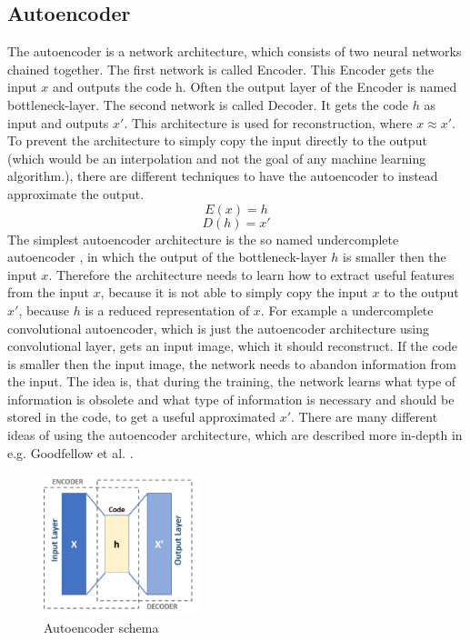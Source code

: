  \subsection{Autoencoder} \label{subsection::autoencoder}
  The autoencoder is a network architecture, which consists of two neural networks chained together. The first network is called Encoder. This Encoder gets the input $x$ and outputs
  the code h. Often the output layer of the Encoder is named bottleneck-layer. The second network is called Decoder. It gets the code $h$ as input
  and outputs $x \prime$. This architecture is used for reconstruction, where $x \approx x \prime$. To prevent the architecture to simply copy the input directly to the output (which would be an
  interpolation and not the goal of any machine learning algorithm.), there are different techniques to have the autoencoder to instead approximate the output.
  \begin{equation}
   E(x) = h
  \end{equation}
  \begin{equation}
   D(h) = x \prime
  \end{equation}
  The simplest autoencoder architecture is the so named undercomplete autoencoder \cite{Goodfellow2016}, in which the output of the bottleneck-layer $h$ is smaller then the input $x$.
  Therefore the architecture needs to learn how to extract useful features from the input $x$, because it is not able to simply copy the input $x$ to the output $x \prime$, because $h$ is a reduced
  representation of $x$.
  For example a undercomplete convolutional autoencoder, which is just the autoencoder architecture using convolutional layer, gets an input image, which it 
  should reconstruct.
  If the code is smaller then the input image, the network needs to abandon information from the input. The idea is, that during the training, the network learns
  what type of information is obsolete and what type of information is necessary and should be stored in the code, to get a useful approximated $x \prime$.  
  There are many different ideas of using the autoencoder architecture, which are described more in-depth in e.g. Goodfellow et al. \cite{Goodfellow2016}.
  \begin{figure}[H]
   \includegraphics[width=0.4\textwidth]{../Images/autoencoder_schema.png}
   \centering
   \caption{Autoencoder schema \cite{wiki2019}}
   \label{fig:lstm_architecture}
  \end{figure}
  

